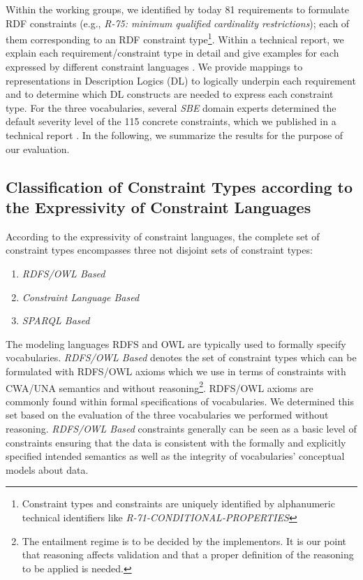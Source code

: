 \documentclass[conference]{IEEEtran}
\begin{document}
Within the working groups, we identified by today 81 requirements to formulate RDF constraints (e.g., \emph{R-75: minimum qualified cardinality restrictions}); each of them corresponding to an RDF constraint type\footnote{Constraint types and constraints are uniquely identified by alphanumeric technical identifiers like \emph{R-71-CONDITIONAL-PROPERTIES}}. 
Within a technical report, we explain each requirement/constraint type in detail and give examples for each expressed by different constraint languages \cite{BoschNolleAcarEckert2015}. We provide mappings to representations in Description Logics (DL) \cite{Baader-2003} to logically underpin each requirement and to determine which DL constructs are needed to express each constraint type.
For the three vocabularies, several \emph{SBE} domain experts determined the default severity level of the 115 concrete constraints, which we published in a technical report \cite{BoschZapilkoWackerowEckert2015}.
In the following, we summarize the results for the purpose of our evaluation.

\subsection{Classification of Constraint Types according to the Expressivity of Constraint Languages}

According to the expressivity of constraint languages, the complete set of constraint types encompasses three not disjoint sets of constraint types:
\begin{enumerate}
	\item \emph{RDFS/OWL Based}
	\item \emph{Constraint Language Based}
	\item \emph{SPARQL Based}
\end{enumerate}

The modeling languages RDFS and OWL are typically used to formally specify vocabularies. \emph{RDFS/OWL Based} denotes the set of constraint types which can be formulated with RDFS/OWL axioms which we use in terms of constraints with CWA/UNA semantics and without reasoning\footnote{The entailment regime is to be decided by the implementors. It is our point that reasoning affects validation and that a proper definition of the reasoning to be applied is needed.}. RDFS/OWL axioms are commonly found within formal specifications of vocabularies. We determined this set based on the evaluation of the three vocabularies we performed without reasoning. \emph{RDFS/OWL Based} constraints generally can be seen as a basic level of constraints ensuring that the data is consistent with the formally and explicitly specified intended semantics as well as the integrity of vocabularies' conceptual models about data.
\end{document}
